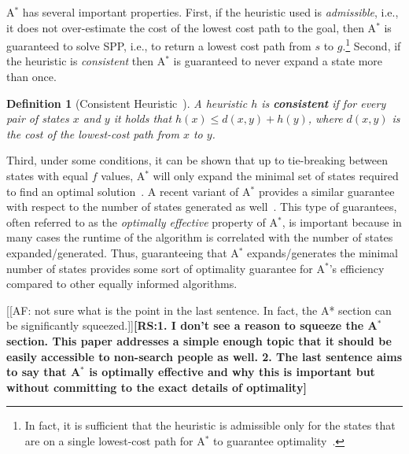 \documentclass{aicom2e}
\newtheorem{definition}{Definition}
\newcommand{\astar}{A$^*$}
\newcommand{\roni}[1]{\textbf{[RS:#1]}}
\begin{document}
\astar{} has several important properties. First, if the heuristic used is {\em
admissible}, i.e., it does not over-estimate the cost of the lowest cost path
to the goal, then \astar{} is guaranteed to solve SPP, i.e., to return a lowest
cost path from $s$ to $g$.\footnote{In fact, it is sufficient that the
heuristic is admissible only for the states that are on a single lowest-cost
path for \astar{} to guarantee
optimality~\cite{karpas2012optimal,dechter1985generalizedBestFirst}.} Second,
if the heuristic is {\em consistent} then \astar{} is guaranteed to never
expand a state more than once.
\begin{definition}[Consistent Heuristic~\cite{hartNR68Astar}]
    A heuristic $h$ is {\bf consistent} if for every pair of states $x$ and $y$
    it holds that $h(x)\leq d(x,y)+h(y)$, where $d(x, y)$ is
    the cost of the lowest-cost path from $x$ to $y$.
    \label{def:consistent}
\end{definition}




Third, under some conditions, it can be shown that up to tie-breaking between
states with equal $f$ values, \astar{} will only expand the minimal set of
states required to find an optimal
solution~\cite{dechter1985generalizedBestFirst}. A recent variant of \astar{}
provides a similar guarantee with respect to the number of states generated as
well~\cite{goldenberg2014enhanced}. This type of guarantees, often referred to
as the {\em optimally effective} property of \astar{}, is  important because in
many cases the runtime of the algorithm is correlated with the number of states
expanded/generated. Thus, guaranteeing that \astar{} expands/generates the
minimal number of states provides some sort of optimality guarantee for
\astar{}'s efficiency compared to other equally informed algorithms.

[[AF: not sure what is the point in the last sentence. In fact, the A* section
can be significantly squeezed.]]\roni{1. I don't see a reason to squeeze the \astar{} section. This paper addresses a simple enough topic that it should be easily accessible to non-search people as well. 2. The last sentence aims to say that \astar{} is optimally effective and why this is important but without committing to the exact details of optimality}
\end{document}
